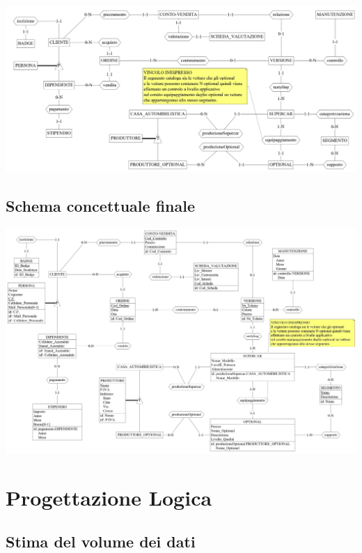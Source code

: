 \documentclass[11pt]{article}
\begin{document}
\begin{center}
    \includegraphics[scale=1.20, angle=90]{images/schemaScheletro.jpeg}
\end{center}

\newpage

\subsection{Schema concettuale finale}
\begin{center}
    \includegraphics[scale=0.95, angle=90]{images/schemaFinale.jpg}
\end{center}

\newpage

\section{Progettazione Logica}

\subsection{Stima del volume dei dati}
\end{document}
